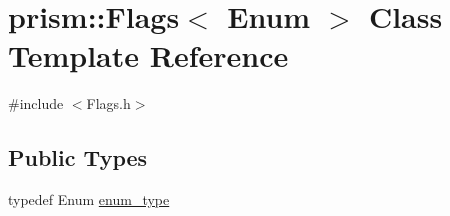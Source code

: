 \hypertarget{classprism_1_1_flags}{}\section{prism\+:\+:Flags$<$ Enum $>$ Class Template Reference}
\label{classprism_1_1_flags}


{\ttfamily \#include $<$Flags.\+h$>$}

\subsection*{Public Types}
\begin{DoxyCompactItemize}
\item 
typedef Enum \hyperlink{classprism_1_1_flags_a2415ba62bc10f8590955edcb9c738e5b}{enum\+\_\+type}
\end{DoxyCompactItemize}
